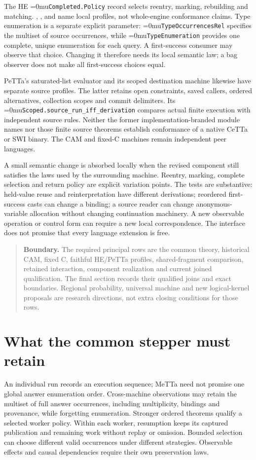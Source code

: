 \documentclass[11pt,a4paper]{article}
\newcommand{\code}[1]{\texttt{\detokenize{#1}}}
\newcommand{\name}[1]{\textup{\Urlmuskip=0mu\relax\nolinkurl{#1}}}
\newcommand{\scope}[1]{\par\smallskip\begin{quote}\small\textbf{Boundary.} #1\end{quote}}
\begin{document}
The HE \name{Completed.Policy} record selects reentry, marking, rebuilding and
matching. \code{unmarked}, \code{ready}, \code{unchangedReady} and
\code{finiteTypes} name local profiles, not whole-engine conformance claims.
Type enumeration is a separate explicit parameter: \name{TypeOccurrencesRel}
specifies the multiset of source occurrences, while \name{TypeEnumeration}
provides one complete, unique enumeration for each query. A first-success
consumer may observe that choice. Changing it therefore needs its local
semantic law; a bag observer does not make all first-success choices equal.

PeTTa's saturated-list evaluator and its scoped destination machine likewise
have separate source profiles. The latter retains open constraints, saved
callers, ordered alternatives, collection scopes and commit delimiters. Its
\name{Scoped.source_run_iff_derivation} compares actual finite execution with
independent source rules. Neither the former implementation-branded module
names nor those finite source theorems establish conformance of a native CeTTa
or SWI binary. The CAM and fixed-C machines remain independent peer languages.

A small semantic change is absorbed locally when the revised component still
satisfies the laws used by the surrounding machine. Reentry, marking, complete
selection and return policy are explicit variation points. The tests are
substantive: held-value reuse and reinterpretation have different derivations;
reordered first-success casts can change a binding; a source reader can change
anonymous-variable allocation without changing continuation machinery. A new
observable operation or control form can require a new local correspondence.
The interface does not promise that every language extension is free.

\scope{The required principal rows are the common theory, historical CAM,
fixed C, faithful HE/PeTTa profiles, shared-fragment comparison, retained
interaction, component realization and current joined qualification. The final
section records their qualified joins and exact boundaries. Regional probability, universal machine
and new logical-kernel proposals are research directions, not extra closing
conditions for those rows.}

\newpage
\section{What the common stepper must retain}

An individual run records an execution sequence; MeTTa need not promise one
global answer enumeration order. Cross-machine observations may retain the
multiset of full answer occurrences, including multiplicity, bindings and
provenance, while forgetting enumeration. Stronger ordered theorems qualify a
selected worker policy. Within each worker, resumption keeps its captured
publication and remaining work without replay or omission. Bounded selection
can choose different valid occurrences under different strategies. Observable
effects and causal dependencies require their own preservation laws.
\end{document}
